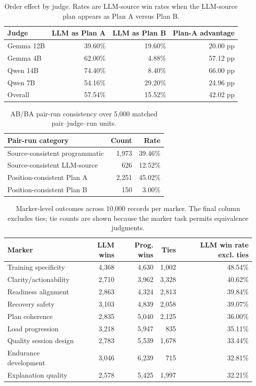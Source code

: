 \documentclass[11pt]{article}
\begin{document}
\begin{table}[H]
\centering
\small
\begin{tabular}{lrrr}
\toprule
Judge & LLM as Plan A & LLM as Plan B & Plan-A advantage \\
\midrule
Gemma 12B & 39.60\% & 19.60\% & 20.00 pp \\
Gemma 4B & 62.00\% & 4.88\% & 57.12 pp \\
Qwen 14B & 74.40\% & 8.40\% & 66.00 pp \\
Qwen 7B & 54.16\% & 29.20\% & 24.96 pp \\
Overall & 57.54\% & 15.52\% & 42.02 pp \\
\bottomrule
\end{tabular}
\caption{Order effect by judge. Rates are LLM-source win rates when the LLM-source plan appears as Plan A versus Plan B.}
\label{tab:order-effect-app}
\end{table}

\begin{table}[H]
\centering
\small
\begin{tabular}{lrr}
\toprule
Pair-run category & Count & Rate \\
\midrule
Source-consistent programmatic & 1,973 & 39.46\% \\
Source-consistent LLM-source & 626 & 12.52\% \\
Position-consistent Plan A & 2,251 & 45.02\% \\
Position-consistent Plan B & 150 & 3.00\% \\
\bottomrule
\end{tabular}
\caption{AB/BA pair-run consistency over 5,000 matched pair--judge--run units.}
\label{tab:pair-run-app}
\end{table}

\begin{table}[H]
\centering
\small
\begin{tabular}{lrrrr}
\toprule
Marker & LLM wins & Prog. wins & Ties & LLM win rate excl. ties \\
\midrule
Training specificity & 4,368 & 4,630 & 1,002 & 48.54\% \\
Clarity/actionability & 2,710 & 3,962 & 3,328 & 40.62\% \\
Readiness alignment & 2,863 & 4,324 & 2,813 & 39.84\% \\
Recovery safety & 3,103 & 4,839 & 2,058 & 39.07\% \\
Plan coherence & 2,835 & 5,040 & 2,125 & 36.00\% \\
Load progression & 3,218 & 5,947 & 835 & 35.11\% \\
Quality session design & 2,783 & 5,539 & 1,678 & 33.44\% \\
Endurance development & 3,046 & 6,239 & 715 & 32.81\% \\
Explanation quality & 2,578 & 5,425 & 1,997 & 32.21\% \\
\bottomrule
\end{tabular}
\caption{Marker-level outcomes across 10,000 records per marker. The final column excludes ties; tie counts are shown because the marker task permits equivalence judgments.}
\label{tab:markers-app}
\end{table}
\end{document}
